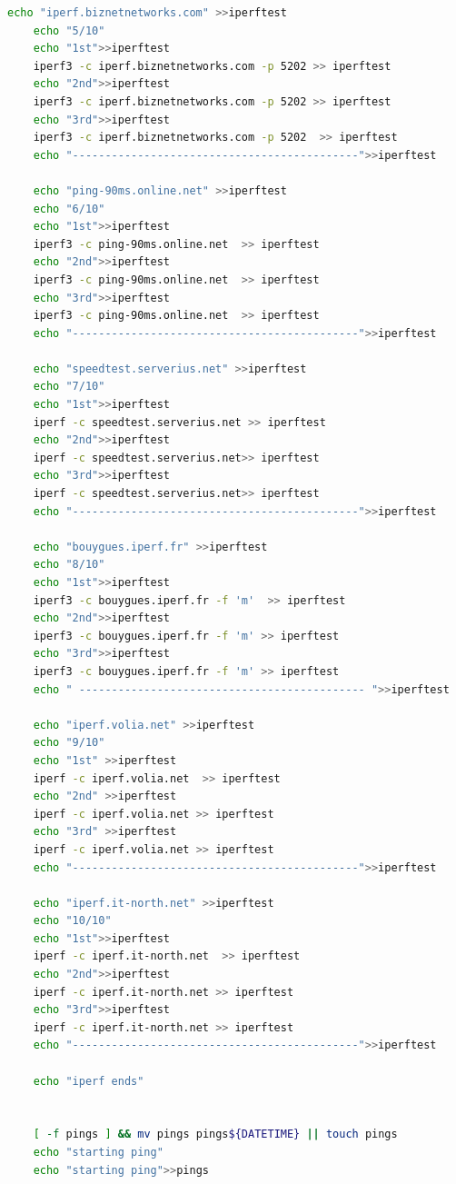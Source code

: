 \documentclass[paper=a4, fontsize=10pt]{scrartcl} %
\numberwithin{equation}{section} %
\numberwithin{figure}{section} %
\numberwithin{table}{section} %
\begin{document}
\begin{lstlisting}[language = bash]
    echo "iperf.biznetnetworks.com" >>iperftest
    echo "5/10"
    echo "1st">>iperftest
    iperf3 -c iperf.biznetnetworks.com -p 5202 >> iperftest
    echo "2nd">>iperftest
    iperf3 -c iperf.biznetnetworks.com -p 5202 >> iperftest
    echo "3rd">>iperftest
    iperf3 -c iperf.biznetnetworks.com -p 5202  >> iperftest
    echo "--------------------------------------------">>iperftest
    
    echo "ping-90ms.online.net" >>iperftest
    echo "6/10"
    echo "1st">>iperftest
    iperf3 -c ping-90ms.online.net  >> iperftest
    echo "2nd">>iperftest
    iperf3 -c ping-90ms.online.net  >> iperftest
    echo "3rd">>iperftest
    iperf3 -c ping-90ms.online.net  >> iperftest
    echo "--------------------------------------------">>iperftest
    
    echo "speedtest.serverius.net" >>iperftest
    echo "7/10"
    echo "1st">>iperftest
    iperf -c speedtest.serverius.net >> iperftest
    echo "2nd">>iperftest
    iperf -c speedtest.serverius.net>> iperftest
    echo "3rd">>iperftest
    iperf -c speedtest.serverius.net>> iperftest
    echo "--------------------------------------------">>iperftest
    
    echo "bouygues.iperf.fr" >>iperftest
    echo "8/10"
    echo "1st">>iperftest
    iperf3 -c bouygues.iperf.fr -f 'm'  >> iperftest
    echo "2nd">>iperftest
    iperf3 -c bouygues.iperf.fr -f 'm' >> iperftest
    echo "3rd">>iperftest
    iperf3 -c bouygues.iperf.fr -f 'm' >> iperftest
    echo " -------------------------------------------- ">>iperftest
    
    echo "iperf.volia.net" >>iperftest
    echo "9/10"
    echo "1st" >>iperftest
    iperf -c iperf.volia.net  >> iperftest
    echo "2nd" >>iperftest
    iperf -c iperf.volia.net >> iperftest
    echo "3rd" >>iperftest
    iperf -c iperf.volia.net >> iperftest
    echo "--------------------------------------------">>iperftest
    
    echo "iperf.it-north.net" >>iperftest
    echo "10/10"
    echo "1st">>iperftest
    iperf -c iperf.it-north.net  >> iperftest
    echo "2nd">>iperftest
    iperf -c iperf.it-north.net >> iperftest
    echo "3rd">>iperftest
    iperf -c iperf.it-north.net >> iperftest
    echo "--------------------------------------------">>iperftest
    
    echo "iperf ends"
    
    
    [ -f pings ] && mv pings pings${DATETIME} || touch pings
    echo "starting ping"
    echo "starting ping">>pings
    

\end{lstlisting}
\end{document}
